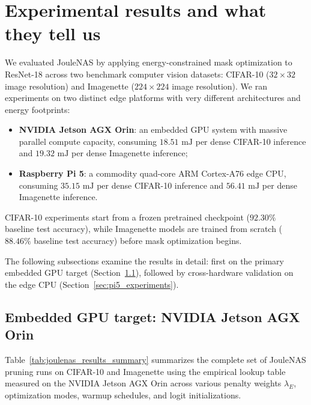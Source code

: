 \section{Experimental results and what they tell us}
\label{sec:experimental_results}

We evaluated JouleNAS by applying energy-constrained mask optimization to ResNet-18 across two benchmark computer vision datasets: CIFAR-10 ($32 \times 32$ image resolution) and Imagenette ($224 \times 224$ image resolution). We ran experiments on two distinct edge platforms with very different architectures and energy footprints:
\begin{itemize}
    \item \textbf{NVIDIA Jetson AGX Orin}: an embedded GPU system with massive parallel compute capacity, consuming $18.51\text{ mJ}$ per dense CIFAR-10 inference and $19.32\text{ mJ}$ per dense Imagenette inference;
    \item \textbf{Raspberry Pi 5}: a commodity quad-core ARM Cortex-A76 edge CPU, consuming $35.15\text{ mJ}$ per dense CIFAR-10 inference and $56.41\text{ mJ}$ per dense Imagenette inference.
\end{itemize}
CIFAR-10 experiments start from a frozen pretrained checkpoint ($92.30\%$ baseline test accuracy), while Imagenette models are trained from scratch ($88.46\%$ baseline test accuracy) before mask optimization begins.

The following subsections examine the results in detail: first on the primary embedded GPU target (Section~\ref{sec:agxorin_experiments}), followed by cross-hardware validation on the edge CPU (Section~\ref{sec:pi5_experiments}).

\subsection{Embedded GPU target: NVIDIA Jetson AGX Orin}
\label{sec:agxorin_experiments}

Table~\ref{tab:joulenas_results_summary} summarizes the complete set of JouleNAS pruning runs on CIFAR-10 and Imagenette using the empirical lookup table measured on the NVIDIA Jetson AGX Orin across various penalty weights $\lambda_E$, optimization modes, warmup schedules, and logit initializations.

